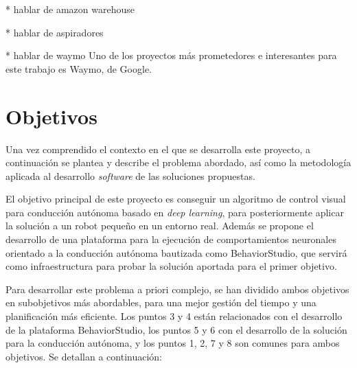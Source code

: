 * hablar de amazon warehouse

* hablar de aspiradores

* hablar de waymo
Uno de los proyectos más prometedores e interesantes para este trabajo es Waymo, de Google.




\section{Objetivos}

Una vez comprendido el contexto en el que se desarrolla este proyecto, a continuación se plantea y describe el problema abordado, así como la metodología aplicada al desarrollo \textit{software} de las soluciones propuestas.

El objetivo principal de este proyecto es conseguir un algoritmo de control visual para conducción autónoma basado en \textit{deep learning}, para posteriormente aplicar la solución a un robot pequeño en un entorno real. Además se propone el desarrollo de una plataforma para la ejecución de comportamientos neuronales orientado a la conducción autónoma bautizada como BehaviorStudio, que servirá como infraestructura para probar la solución aportada para el primer objetivo.

Para desarrollar este problema a priori complejo, se han dividido ambos objetivos en subobjetivos más abordables, para una mejor gestión del tiempo y una planificación más eficiente. Los puntos 3 y 4 están relacionados con el desarrollo de la plataforma BehaviorStudio, los puntos 5 y 6 con el desarrollo de la solución para la conducción autónoma, y los puntos 1, 2, 7 y 8 son comunes para ambos objetivos. Se detallan a continuación:

